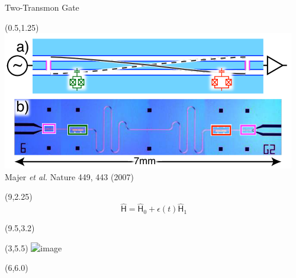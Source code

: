 \documentclass[compress, aspectratio=169]{beamer}
\newcommand{\Op}[1]{\ensuremath{\mathsf{\hat{#1}}}}
\begin{document}
\begin{frame}{Two-Transmon Gate}
  \begin{textblock}{7.5}(0.5,1.25)
    \includegraphics[width=\textwidth]{images/coupled_transmon}\\
    \hfill\tiny{Majer \emph{et al.} Nature 449, 443 (2007)}\hspace{2mm}~\\
  \end{textblock}
  \begin{textblock}{6}(9,2.25)
    \begin{equation*}
      \Op{H} = \Op{H}_0 + \epsilon(t) \Op{H}_1
    \end{equation*}
  \end{textblock}
  \begin{textblock}{5}(9.5,3.2)
  \end{textblock}
  \begin{textblock}{4}(3,5.5)
    \includegraphics<2->[height=3cm]{images/YaoCircuit_cutout}
  \end{textblock}
  \begin{textblock}{10}(6,6.0)
  \end{textblock}
\end{frame}
\end{document}
